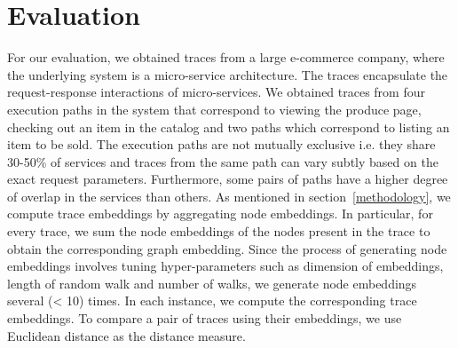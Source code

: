 \section{Evaluation}
For our evaluation, we obtained traces from a large e-commerce company, where the underlying system is a micro-service architecture. The traces encapsulate the request-response interactions of micro-services. We obtained traces from four execution paths in the system that correspond to viewing the produce page, checking out an item in the catalog and two paths which correspond to listing an item to be sold. The execution paths are not mutually exclusive i.e. they share 30-50\% of services and traces from the same path can vary subtly based on the exact request parameters. Furthermore, some pairs of  paths have a higher degree of overlap in the services than others. As mentioned in  section~\ref{methodology}, we compute trace embeddings by aggregating node embeddings. In particular, for every trace, we sum the node embeddings of the nodes present in the trace to obtain the corresponding graph embedding. Since the process of generating node embeddings involves tuning hyper-parameters such as dimension of embeddings, length of random walk and number of walks, we generate node embeddings several (< 10) times. In each instance, we compute the corresponding trace embeddings. To compare a pair of traces using their embeddings, we use Euclidean distance as the distance measure.

  
